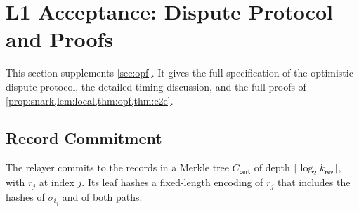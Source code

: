 \documentclass[10pt,journal,compsoc]{IEEEtran}
\theoremstyle{tplain}
\theoremstyle{tdef}
\theoremstyle{remark}
\newcommand{\kr}{k_{\mathsf{rev}}}
\newcommand{\cert}{\mathsf{cert}}
\begin{document}
\section{L1 Acceptance: Dispute Protocol and Proofs}\label{S-opf}

This section supplements \cref{sec:opf}. It gives the full specification of the optimistic dispute protocol, the detailed timing discussion, and the full proofs of \cref{prop:snark,lem:local,thm:opf,thm:e2e}.

\subsection{Record Commitment}
The relayer commits to the records in a Merkle tree $C_{\cert}$ of depth $\lceil\log_2\kr\rceil$, with $r_j$ at index $j$. Its leaf hashes a fixed-length encoding of $r_j$ that includes the hashes of $\sigma_{i_j}$ and of both paths.
\end{document}
